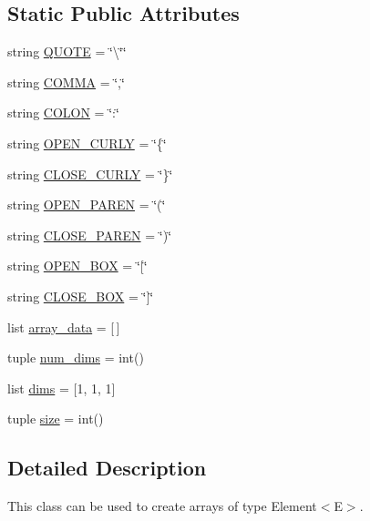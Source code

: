 \subsection*{Static Public Attributes}
\begin{DoxyCompactItemize}
\item 
string \hyperlink{class_array_1_1_array_ae6bdb390ddba8126d3746296feccbf3a}{Q\+U\+O\+T\+E} = \char`\"{}\textbackslash{}\char`\"{}\char`\"{}
\item 
string \hyperlink{class_array_1_1_array_a050cf5fc5abfaee35b7960392d2a116f}{C\+O\+M\+M\+A} = \char`\"{},\char`\"{}
\item 
string \hyperlink{class_array_1_1_array_a9cd7f5a4340a676e8d7ec8a4fe6aaab7}{C\+O\+L\+O\+N} = \char`\"{}\+:\char`\"{}
\item 
string \hyperlink{class_array_1_1_array_a62203d6bf7e524eba3c9aaa28a139e2a}{O\+P\+E\+N\+\_\+\+C\+U\+R\+L\+Y} = \char`\"{}\{\char`\"{}
\item 
string \hyperlink{class_array_1_1_array_a36be40d3e5e79a0f0b541c170b8f2984}{C\+L\+O\+S\+E\+\_\+\+C\+U\+R\+L\+Y} = \char`\"{}\}\char`\"{}
\item 
string \hyperlink{class_array_1_1_array_ae1b619f58c038bca0e42114ec4afcd08}{O\+P\+E\+N\+\_\+\+P\+A\+R\+E\+N} = \char`\"{}(\char`\"{}
\item 
string \hyperlink{class_array_1_1_array_ac2b5bdf724baa7b645ffa0a569407213}{C\+L\+O\+S\+E\+\_\+\+P\+A\+R\+E\+N} = \char`\"{})\char`\"{}
\item 
string \hyperlink{class_array_1_1_array_a2bcecc8c5d787a739ec9bf8beb52fc77}{O\+P\+E\+N\+\_\+\+B\+O\+X} = \char`\"{}\mbox{[}\char`\"{}
\item 
string \hyperlink{class_array_1_1_array_ac8b79f827e1acec43ff2ddb4089abbe1}{C\+L\+O\+S\+E\+\_\+\+B\+O\+X} = \char`\"{}\mbox{]}\char`\"{}
\item 
list \hyperlink{class_array_1_1_array_aadd55f758422d491e4a6b51b3652f030}{array\+\_\+data} = \mbox{[}$\,$\mbox{]}
\item 
tuple \hyperlink{class_array_1_1_array_a3517087ba9c9e5bdc7e8cf4b0593decb}{num\+\_\+dims} = int()
\item 
list \hyperlink{class_array_1_1_array_ab0f0de822ea2ff937cbfbcf64081ff11}{dims} = \mbox{[}1, 1, 1\mbox{]}
\item 
tuple \hyperlink{class_array_1_1_array_ae605a16bf709991444aa703af03ef63d}{size} = int()
\end{DoxyCompactItemize}


\subsection{Detailed Description}
This class can be used to create arrays of type Element$<$\+E$>$. 

